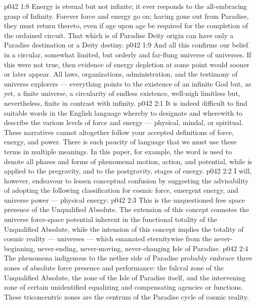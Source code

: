 \vs p042 1:8 Energy is eternal but not infinite; it ever responds to the all\hyp{}embracing grasp of Infinity. Forever force and energy go on; having gone out from Paradise, they must return thereto, even if age upon age be required for the completion of the ordained circuit. That which is of Paradise Deity origin can have only a Paradise destination or a Deity destiny.
\vs p042 1:9 \pc And all this confirms our belief in a circular, somewhat limited, but orderly and far\hyp{}flung universe of universes. If this were not true, then evidence of energy depletion at some point would sooner or later appear. All laws, organizations, administration, and the testimony of universe explorers --- everything points to the existence of an infinite God but, as yet, a finite universe, a circularity of endless existence, well\hyp{}nigh limitless but, nevertheless, finite in contrast with infinity.
\vs p042 2:1 It is indeed difficult to find suitable words in the English language whereby to designate and wherewith to describe the various levels of force and energy --- physical, mindal, or spiritual. These narratives cannot altogether follow your accepted definitions of force, energy, and power. There is such paucity of language that we must use these terms in multiple meanings. In this paper, for example, the word  is used to denote all phases and forms of phenomenal motion, action, and potential, while  is applied to the pregravity, and  to the postgravity, stages of energy.
\vs p042 2:2 I will, however, endeavour to lessen conceptual confusion by suggesting the advisability of adopting the following classification for cosmic force, emergent energy, and universe power --- physical energy:
\vs p042 2:3 \bibnobreakspace {} This is the unquestioned free space presence of the Unqualified Absolute. The extension of this concept connotes the universe force\hyp{}space potential inherent in the functional totality of the Unqualified Absolute, while the intension of this concept implies the totality of cosmic reality --- universes --- which emanated eternitywise from the never\hyp{}beginning, never\hyp{}ending, never\hyp{}moving, never\hyp{}changing Isle of Paradise.
\vs p042 2:4 The phenomena indigenous to the nether side of Paradise probably embrace three zones of absolute force presence and performance: the fulcral zone of the Unqualified Absolute, the zone of the Isle of Paradise itself, and the intervening zone of certain unidentified equalizing and compensating agencies or functions. These triconcentric zones are the centrum of the Paradise cycle of cosmic reality.
